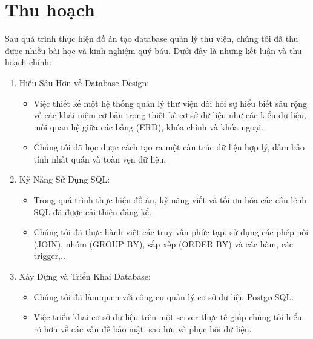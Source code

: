 \documentclass[12pt]{article}
\begin{document}
\section{Thu hoạch}
Sau quá trình thực hiện đồ án tạo database quản lý thư viện, chúng tôi đã thu được nhiều bài học và kinh nghiệm quý báu. Dưới đây là những kết luận và thu hoạch chính:
\begin{enumerate}
    \item Hiểu Sâu Hơn về Database Design:
    \begin{itemize}
        \item Việc thiết kế một hệ thống quản lý thư viện đòi hỏi sự hiểu biết sâu rộng về các khái niệm cơ bản trong thiết kế cơ sở dữ liệu như các kiểu dữ liệu, mối quan hệ giữa các bảng (ERD), khóa chính và khóa ngoại.
        \item Chúng tôi đã học được cách tạo ra một cấu trúc dữ liệu hợp lý, đảm bảo tính nhất quán và toàn vẹn dữ liệu.
    \end{itemize}
\item Kỹ Năng Sử Dụng SQL:
 \begin{itemize}
        \item Trong quá trình thực hiện đồ án, kỹ năng viết và tối ưu hóa các câu lệnh SQL đã được cải thiện đáng kể.
        \item Chúng tôi đã thực hành viết các truy vấn phức tạp, sử dụng các phép nối (JOIN), nhóm (GROUP BY), sắp xếp (ORDER BY) và các hàm, các trigger,..
    \end{itemize}
\item Xây Dựng và Triển Khai Database:
 \begin{itemize}
        \item Chúng tôi đã làm quen với công cụ quản lý cơ sở dữ liệu PostgreSQL.
        \item Việc triển khai cơ sở dữ liệu trên một server thực tế giúp chúng tôi hiểu rõ hơn về các vấn đề bảo mật, sao lưu và phục hồi dữ liệu.
    \end{itemize}


\end{enumerate}
\end{document}
